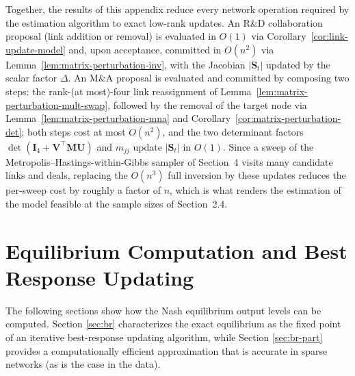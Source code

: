Together, the results of this appendix reduce every network operation
required by the estimation algorithm to exact low-rank updates. An R\&D
collaboration proposal (link addition or removal) is evaluated in $O(1)$
via Corollary~\ref{cor:link-update-model} and, upon acceptance,
committed in $O(n^2)$ via Lemma~\ref{lem:matrix-perturbation-inv}, with
the Jacobian $|\mathbf{S}_t|$ updated by the scalar factor $\Delta$. An
M\&A proposal is evaluated and committed by composing two steps:
the rank-(at most)-four link reassignment of
Lemma~\ref{lem:matrix-perturbation-mult-swap}, followed by the removal
of the target node via Lemma~\ref{lem:matrix-perturbation-mna} and
Corollary~\ref{cor:matrix-perturbation-det}; both steps cost at most
$O(n^2)$, and the two determinant factors $\det(\mathbf{I}_4 +
\mathbf{V}^\top \mathbf{M} \mathbf{U})$ and $m_{jj}$ update
$|\mathbf{S}_t|$ in $O(1)$. Since a sweep of the
Metropolis--Hastings-within-Gibbs sampler of Section~4 visits many
candidate links and deals, replacing the $O(n^3)$ full inversion by
these updates reduces the per-sweep cost by roughly a factor of $n$,
which is what renders the estimation of the model feasible at the
sample sizes of Section~2.4.

\section{Equilibrium Computation and Best Response Updating}
\label{sec:equilib-comp}
The following sections show how the Nash equilibrium output levels can be computed. Section \ref{sec:br} characterizes the exact equilibrium as the fixed point of an iterative best-response updating algorithm, while Section \ref{sec:br-part} provides a computationally efficient approximation that is accurate in sparse networks (as is the case in the data).

